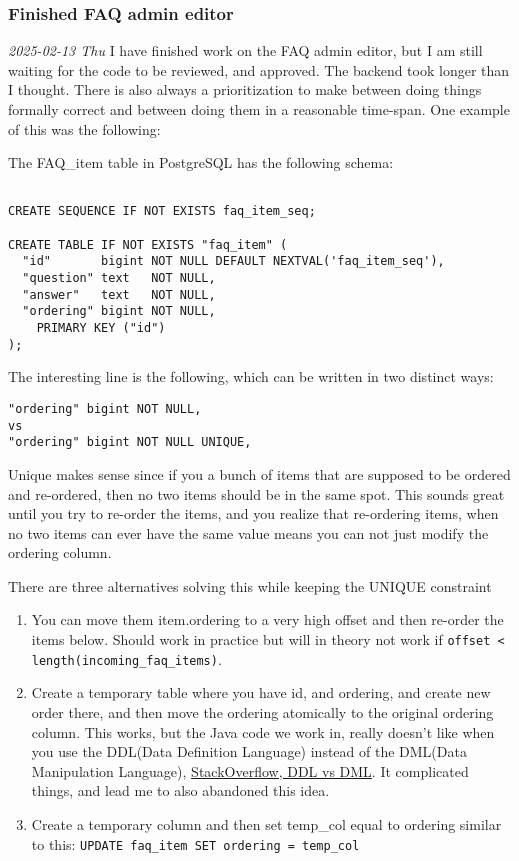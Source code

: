 \documentclass[../main.tex]{subfiles}
\begin{document}
\subsubsection{\textbf{Finished FAQ admin editor}}

\textit{2025-02-13 Thu} I have finished work on the FAQ admin editor, but I am still waiting for the code to be reviewed, and approved. The backend took longer than I thought. There is also always a prioritization to make between doing things formally correct and between doing them in a reasonable time-span. One example of this was the following:

The FAQ\_item table in PostgreSQL has the following schema:

\begin{verbatim}
    
CREATE SEQUENCE IF NOT EXISTS faq_item_seq;
  
CREATE TABLE IF NOT EXISTS "faq_item" ( 
  "id"       bigint NOT NULL DEFAULT NEXTVAL('faq_item_seq'),
  "question" text   NOT NULL,
  "answer"   text   NOT NULL,
  "ordering" bigint NOT NULL,
    PRIMARY KEY ("id")
);

\end{verbatim}

The interesting line is the following, which can be written in two distinct ways:

\begin{verbatim}
"ordering" bigint NOT NULL,
vs
"ordering" bigint NOT NULL UNIQUE,
\end{verbatim}

Unique makes sense since if you a bunch of items that are supposed to be ordered and re-ordered, then no two items should be in the same spot. This sounds great until you try to re-order the items, and you realize that re-ordering items, when no two items can ever have the same value means you can not just modify the ordering column.

There are three alternatives solving this while keeping the UNIQUE constraint

\begin{enumerate}
\def\labelenumi{\arabic{enumi}.}
\item You can move them item.ordering to a very high offset and then re-order the items below. Should work in practice but will in theory not work if \verb|offset < length(incoming_faq_items)|. 

\item  Create a temporary table where you have id, and ordering, and create new order there, and then move the ordering atomically to the original ordering column. This works, but the Java code we work in, really doesn't like when you use the DDL(Data Definition Language) instead of the DML(Data Manipulation Language), \href{https://stackoverflow.com/questions/2578194/what-are-ddl-and-dml}{StackOverflow, DDL vs DML}. It complicated things, and lead me to also abandoned this idea.
\item Create a temporary column and then set temp\_col equal to ordering similar to this: \verb|UPDATE faq_item SET ordering = temp_col|
\end{enumerate}
\end{document}
